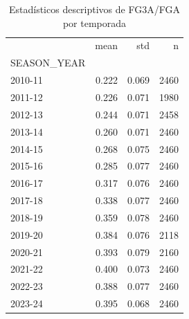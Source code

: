 \begin{table}
\caption{Estadísticos descriptivos de FG3A/FGA por temporada}
\label{tab:anova-desc-fg3}
\begin{tabular}{lrrr}
\toprule
 & mean & std & n \\
SEASON_YEAR &  &  &  \\
\midrule
2010-11 & 0.222 & 0.069 & 2460 \\
2011-12 & 0.226 & 0.071 & 1980 \\
2012-13 & 0.244 & 0.071 & 2458 \\
2013-14 & 0.260 & 0.071 & 2460 \\
2014-15 & 0.268 & 0.075 & 2460 \\
2015-16 & 0.285 & 0.077 & 2460 \\
2016-17 & 0.317 & 0.076 & 2460 \\
2017-18 & 0.338 & 0.077 & 2460 \\
2018-19 & 0.359 & 0.078 & 2460 \\
2019-20 & 0.384 & 0.076 & 2118 \\
2020-21 & 0.393 & 0.079 & 2160 \\
2021-22 & 0.400 & 0.073 & 2460 \\
2022-23 & 0.388 & 0.077 & 2460 \\
2023-24 & 0.395 & 0.068 & 2460 \\
\bottomrule
\end{tabular}
\end{table}
